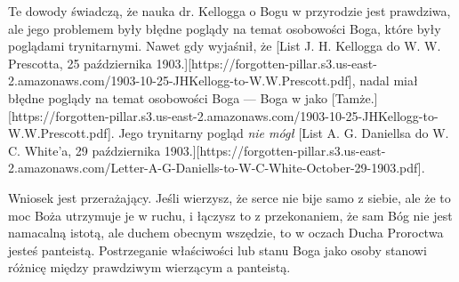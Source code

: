 Te dowody świadczą, że nauka dr. Kellogga o Bogu w przyrodzie jest prawdziwa, ale jego problemem były błędne poglądy na temat osobowości Boga, które były poglądami trynitarnymi. Nawet gdy wyjaśnił, że [List J. H. Kellogga do W. W. Prescotta, 25 października 1903.][https://forgotten-pillar.s3.us-east-2.amazonaws.com/1903-10-25-JHKellogg-to-W.W.Prescott.pdf], nadal miał błędne poglądy na temat osobowości Boga — Boga w  jako [Tamże.][https://forgotten-pillar.s3.us-east-2.amazonaws.com/1903-10-25-JHKellogg-to-W.W.Prescott.pdf]. Jego trynitarny pogląd \textit{nie mógł} [List A. G. Daniellsa do W. C. White’a, 29 października 1903.][https://forgotten-pillar.s3.us-east-2.amazonaws.com/Letter-A-G-Daniells-to-W-C-White-October-29-1903.pdf].

Wniosek jest przerażający. Jeśli wierzysz, że serce nie bije samo z siebie, ale że to moc Boża utrzymuje je w ruchu, i łączysz to z przekonaniem, że sam Bóg nie jest namacalną istotą, ale duchem obecnym wszędzie, to w oczach Ducha Proroctwa jesteś panteistą. Postrzeganie właściwości lub stanu Boga jako osoby stanowi różnicę między prawdziwym wierzącym a panteistą.


